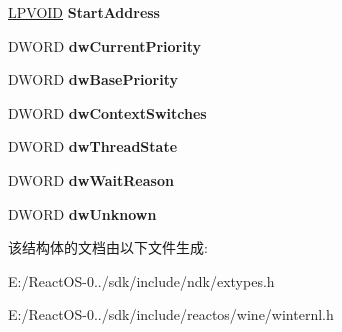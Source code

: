 \begin{DoxyCompactItemize}
\hyperlink{interfacevoid}{L\+P\+V\+O\+ID} {\bfseries Start\+Address}
\item 
\mbox{\label{struct___s_y_s_t_e_m___t_h_r_e_a_d___i_n_f_o_r_m_a_t_i_o_n_a803226212e63f3db51ce992b3b41ea6e}} 
D\+W\+O\+RD {\bfseries dw\+Current\+Priority}
\item 
\mbox{\label{struct___s_y_s_t_e_m___t_h_r_e_a_d___i_n_f_o_r_m_a_t_i_o_n_a091b2063bb83bd76bd0912e4cf699eef}} 
D\+W\+O\+RD {\bfseries dw\+Base\+Priority}
\item 
\mbox{\label{struct___s_y_s_t_e_m___t_h_r_e_a_d___i_n_f_o_r_m_a_t_i_o_n_abc2b9245ea114a373ae4962f60b5a952}} 
D\+W\+O\+RD {\bfseries dw\+Context\+Switches}
\item 
\mbox{\label{struct___s_y_s_t_e_m___t_h_r_e_a_d___i_n_f_o_r_m_a_t_i_o_n_a8d707c9537417c2d68bb93358adb9c35}} 
D\+W\+O\+RD {\bfseries dw\+Thread\+State}
\item 
\mbox{\label{struct___s_y_s_t_e_m___t_h_r_e_a_d___i_n_f_o_r_m_a_t_i_o_n_a1e7b21c204ee59b1a15da291c506fa41}} 
D\+W\+O\+RD {\bfseries dw\+Wait\+Reason}
\item 
\mbox{\label{struct___s_y_s_t_e_m___t_h_r_e_a_d___i_n_f_o_r_m_a_t_i_o_n_a8d83197c8f0881555643203200d2c89f}} 
D\+W\+O\+RD {\bfseries dw\+Unknown}
\end{DoxyCompactItemize}


该结构体的文档由以下文件生成\+:\begin{DoxyCompactItemize}
\item 
E\+:/\+React\+O\+S-\/0../sdk/include/ndk/extypes.\+h\item 
E\+:/\+React\+O\+S-\/0../sdk/include/reactos/wine/winternl.\+h\end{DoxyCompactItemize}
